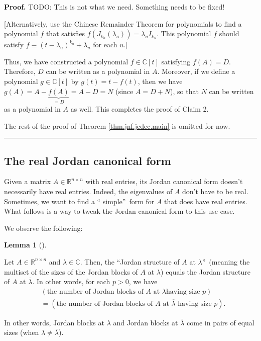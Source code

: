 \documentclass[numbers=enddot,12pt,final,onecolumn,notitlepage]{scrartcl}%
\numberwithin{exer}{subsection}
\theoremstyle{definition}
\newtheorem{lem}[theo]{Lemma}
\newenvironment{lemma}[1][]
{\begin{lem}[#1]\begin{leftbar}}
{\end{leftbar}\end{lem}}
\newenvironment{proof}[1][Proof]{\noindent\textbf{#1.} }{\ \rule{0.5em}{0.5em}}
\newenvironment{noncompile}{}{}
\begin{document}
\begin{proof}
\begin{noncompile}
TODO: This is not what we need. Something needs to be fixed!

[Alternatively, use the Chinese Remainder Theorem for polynomials to find a
polynomial $f$ that satisfies $f\left(  J_{k_{u}}\left(  \lambda_{u}\right)
\right)  =\lambda_{u}I_{k_{u}}$. This polynomial $f$ should satisfy
$f\equiv\left(  t-\lambda_{u}\right)  ^{k_{u}}+\lambda_{u}$ for each $u$.]

Thus, we have constructed a polynomial $f\in\mathbb{C}\left[  t\right]  $
satisfying $f\left(  A\right)  =D$. Therefore, $D$ can be written as a
polynomial in $A$. Moreover, if we define a polynomial $g\in\mathbb{C}\left[
t\right]  $ by $g\left(  t\right)  =t-f\left(  t\right)  $, then we have
$g\left(  A\right)  =A-\underbrace{f\left(  A\right)  }_{=D}=A-D=N$ (since
$A=D+N$), so that $N$ can be written as a polynomial in $A$ as well. This
completes the proof of Claim 2.
\end{noncompile}

The rest of the proof of Theorem \ref{thm.jnf.jcdec.main} is omitted for now.
\end{proof}

\subsection{The real Jordan canonical form}

Given a matrix $A\in\mathbb{R}^{n\times n}$ with real entries, its Jordan
canonical form doesn't necessarily have real entries. Indeed, the eigenvalues
of $A$ don't have to be real. Sometimes, we want to find a \textquotedblleft
simple\textquotedblright\ form for $A$ that does have real entries. What
follows is a way to tweak the Jordan canonical form to this use case.

We observe the following:

\begin{lemma}
\label{lem.jnf.real-jord.same-nums}Let $A\in\mathbb{R}^{n\times n}$ and
$\lambda\in\mathbb{C}$. Then, the \textquotedblleft Jordan structure of $A$ at
$\lambda$\textquotedblright\ (meaning the multiset of the sizes of the Jordan
blocks of $A$ at $\lambda$) equals the Jordan structure of $A$ at
$\overline{\lambda}$. In other words, for each $p>0$, we have%
\begin{align*}
&  \left(  \text{the number of Jordan blocks of }A\text{ at }\lambda\text{
having size }p\right) \\
&  =\left(  \text{the number of Jordan blocks of }A\text{ at }\overline
{\lambda}\text{ having size }p\right)  .
\end{align*}


In other words, Jordan blocks at $\lambda$ and Jordan blocks at $\overline
{\lambda}$ come in pairs of equal sizes (when $\lambda\neq\overline{\lambda}$).
\end{lemma}
\end{document}
